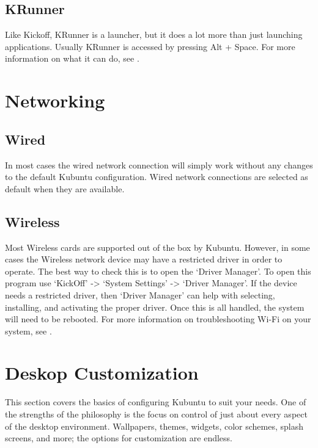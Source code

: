 \documentclass[letterpaper,10pt,english]{sphinxmanual}
\begin{document}
\subsection{KRunner}
\label{\detokenize{docs/basic:krunner}}
Like Kickoff, KRunner is a launcher, but it does a lot more than just launching applications. Usually KRunner is accessed by pressing Alt + Space. For more information on what it can do, see .


\section{Networking}
\label{\detokenize{docs/basic:networking}}


\subsection{Wired}
\label{\detokenize{docs/basic:wired}}
In most cases the wired network connection will simply work without any changes to the default Kubuntu configuration. Wired network connections are selected as default when they are available.


\subsection{Wireless}
\label{\detokenize{docs/basic:wireless}}
Most Wireless cards are supported out of the box by Kubuntu. However, in some cases the Wireless network device may have a restricted driver in order to operate. The best way to check this is to open the ‘Driver Manager’. To open this program use ‘KickOff’ -\textgreater{} ‘System Settings’ -\textgreater{} ‘Driver Manager’. If the device needs a restricted driver, then ‘Driver Manager’ can help with selecting, installing, and activating the proper driver. Once this is all handled, the system will need to be rebooted. For more information on troubleshooting Wi-Fi on your system, see .


\section{Deskop Customization}
\label{\detokenize{docs/basic:deskop-customization}}
This section covers the basics of configuring Kubuntu to suit your needs. One of the strengths of the  philosophy is the focus on control of just about every aspect of the desktop environment. Wallpapers, themes, widgets, color schemes, splash screens, and more; the options for customization are endless.
\end{document}
